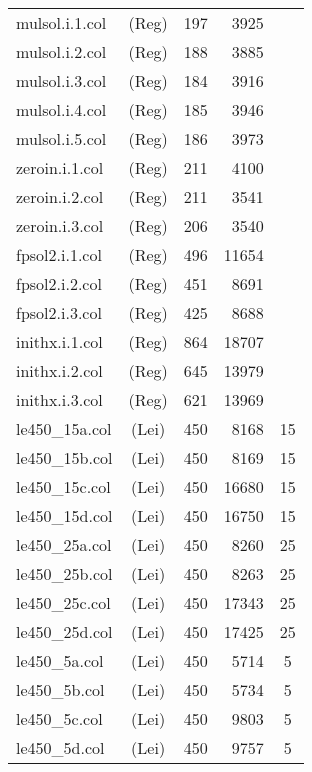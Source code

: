 
\tablelasttail{\hline}
\begin{supertabular}{|lc|rr|c|}
mulsol.i.1.col&(Reg)&197&3925&\\
mulsol.i.2.col&(Reg)&188&3885&\\
mulsol.i.3.col&(Reg)&184&3916&\\
mulsol.i.4.col&(Reg)&185&3946&\\
mulsol.i.5.col&(Reg)&186&3973&\\
zeroin.i.1.col&(Reg)&211&4100&\\
zeroin.i.2.col&(Reg)&211&3541&\\
zeroin.i.3.col&(Reg)&206&3540&\\
fpsol2.i.1.col&(Reg)&496 &11654 & \\
fpsol2.i.2.col&(Reg)&451 &8691 & \\
fpsol2.i.3.col&(Reg)&425 &8688 & \\
inithx.i.1.col&(Reg)&864 &18707 & \\
inithx.i.2.col&(Reg)&645 &13979 & \\
inithx.i.3.col&(Reg)&621 &13969 & \\
le450\_15a.col&(Lei)&450&8168&15\\
le450\_15b.col&(Lei)&450&8169&15\\
le450\_15c.col&(Lei)&450&16680&15\\
le450\_15d.col&(Lei)&450&16750&15\\
le450\_25a.col&(Lei)&450&8260&25\\
le450\_25b.col&(Lei)&450&8263&25\\
le450\_25c.col&(Lei)&450&17343&25\\
le450\_25d.col&(Lei)&450&17425&25\\
le450\_5a.col&(Lei)&450&5714&5\\
le450\_5b.col&(Lei)&450&5734&5\\
le450\_5c.col&(Lei)&450&9803&5\\
le450\_5d.col&(Lei)&450&9757&5\\

\end{supertabular}
